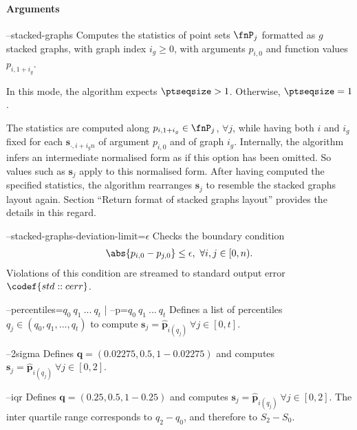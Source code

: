 \paragraph{Arguments}

\procarginseq{\ptseqsize}

\procargout

\begin{procarg}{--stacked-graphs}
  Computes the statistics of point sets $\fnP_j$ formatted as $g$ stacked graphs, with graph index $i_g \geq 0$, with arguments $p_{i,0}$ and function values $p_{i,1+i_g}$.
  
  In this mode, the algorithm expects $\ptseqsize > 1$. Otherwise, $\ptseqsize = 1$.
  
  The statistics are computed along $p_{i,1+i_g} \in \fnP_j$, $\forall j$, while having both $i$ and $i_g$ fixed for each $\bm s_{\cdot,i+i_g n}$ of argument $p_{i,0}$ and of graph $i_g$. Internally, the algorithm infers an intermediate normalised form as if this option has been omitted. So values such as $\bm s_j$ apply to this normalised form. After having computed the specified statistics, the algorithm rearranges $\bm s_j$ to resemble the stacked graphs layout again. Section \enquote{Return format of stacked graphs layout} provides the details in this regard.
\end{procarg}

\begin{procarg}{--stacked-graphs-deviation-limit=$\epsilon$}
  Checks the boundary condition
  \begin{align*}
    \abs{p_{i,0} - p_{j,0}} \leq \epsilon,\ \forall i,j \in [0,n).
  \end{align*}
  Violations of this condition are streamed to standard output error $\codef{std::cerr}$.
\end{procarg}

\begin{procarg}{--percentiles=$q_0\ q_1\ ...\ q_t$ | --p=$q_0\ q_1\ ...\ q_t$}
  Defines a list of percentiles $q_j \in (q_0, q_1, ..., q_t)$ to compute $\bm s_j = \widehat{\bm p}_{i(q_j)}\ \forall j \in [0,t]$.
\end{procarg}

\begin{procarg}{--2sigma}
  Defines $\bm q = (\num{0.02275}, \num{0.5}, 1 - \num{0.02275})$ and computes $\bm s_j = \widehat{\bm p}_{i(q_j)}\ \forall j \in [0,2]$.
\end{procarg}

\begin{procarg}{--iqr}
  Defines $\bm q = (\num{0.25}, {0.5}, 1 - \num{0.25})$ and computes $\bm s_j = \widehat{\bm p}_{i(q_j)}\ \forall j \in [0,2]$. The inter quartile range corresponds to $q_2 - q_0$, and therefore to $S_2 - S_0$.
\end{procarg}

